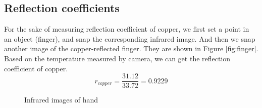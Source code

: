 \documentclass[english]{article}
\begin{document}
\subsection{Reflection coefficients}
For the sake of measuring reflection coefficient of copper, we first set a point in an object (finger), and snap the corresponding infrared image.
And then we snap another image of the copper-reflected finger.
They are shown in Figure \ref{fig:finger}. 
Based on the temperature measured by camera, we can get the reflection coefficient of copper.
$$
r_{copper} = \frac{31.12}{33.72} = 0.9229
$$
\begin{figure}[H]
	\centering
	\caption{Infrared images of hand}
	\label{fig:Transf}
\end{figure}
\end{document}
